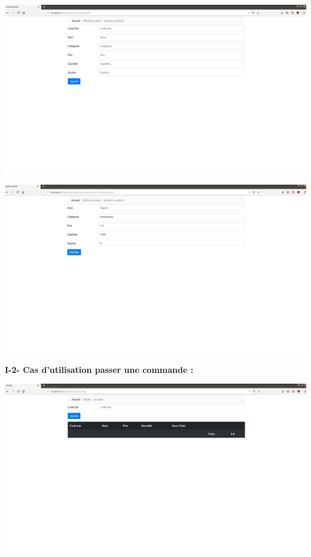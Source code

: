\documentclass[french,10pt,a4paper]{report}
\begin{document}
\begin{center}
	\includegraphics[scale=0.15]{captures/4.png}
\end{center}
\begin{center}
	\includegraphics[scale=0.15]{captures/5.png}
\end{center}
\textbf{I-2- Cas d'utilisation passer une commande :}
\begin{center}
	\includegraphics[scale=0.15]{captures/6.png}
\end{center}
\end{document}

